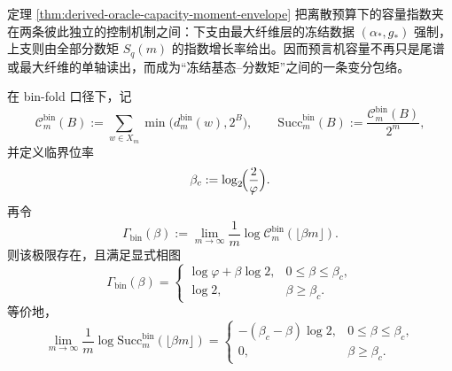 \begin{remark}[冻结基态与分数矩的双包络]\label{rem:derived-oracle-capacity-moment-envelope}
定理 \ref{thm:derived-oracle-capacity-moment-envelope} 把离散预算下的容量指数夹在两条彼此独立的控制机制之间：下支由最大纤维层的冻结数据 \((\alpha_*,g_*)\) 强制，上支则由全部分数矩 \(S_q(m)\) 的指数增长率给出。因而预言机容量不再只是尾谱或最大纤维的单轴读出，而成为“冻结基态--分数矩”之间的一条变分包络。
\end{remark}

\begin{theorem}\label{thm:derived-binfold-oracle-capacity-phase-diagram}
在 bin-fold 口径下，记
\[
\mathcal C_m^{\mathrm{bin}}(B):=\sum_{w\in X_m}\min\bigl(d_m^{\mathrm{bin}}(w),2^B\bigr),
\qquad
\mathrm{Succ}^{\mathrm{bin}}_m(B):=\frac{\mathcal C_m^{\mathrm{bin}}(B)}{2^m},
\]
并定义临界位率
\[
\beta_c:=\log_2\!\Bigl(\frac{2}{\varphi}\Bigr).
\]
再令
\[
\Gamma_{\mathrm{bin}}(\beta):=
\lim_{m\to\infty}\frac1m\log \mathcal C_m^{\mathrm{bin}}(\lfloor \beta m\rfloor).
\]
则该极限存在，且满足显式相图
\[
\boxed{
\Gamma_{\mathrm{bin}}(\beta)=
\begin{cases}
\log\varphi+\beta\log 2, & 0\le \beta\le \beta_c,\\[2mm]
\log 2, & \beta\ge \beta_c.
\end{cases}}
\]
等价地，
\[
\boxed{
\lim_{m\to\infty}\frac1m\log \mathrm{Succ}^{\mathrm{bin}}_m(\lfloor \beta m\rfloor)
=
\begin{cases}
-(\beta_c-\beta)\log 2, & 0\le \beta\le \beta_c,\\[2mm]
0, & \beta\ge \beta_c.
\end{cases}}
\]
\end{theorem}
